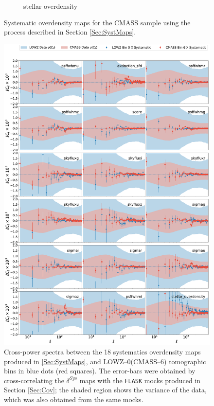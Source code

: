 \begin{figure}
\begin{subfigure}{.33\textwidth}
\label{fig:systmap18}
    \caption{stellar overdensity}
\end{subfigure}
\caption[Systematic overdensity maps]{Systematic overdensity maps for the CMASS sample using the process described in Section \ref{Sec:SystMaps}.}
\label{fig:SYS_Appendix1Map}
\end{figure}

\begin{figure}
\begin{center}
\includegraphics[width=\textwidth]{BOSS-FIGS/systematics_CMASS_Bin0_LOWZ_Bin0.pdf}
\caption[Cross-power spectra between systematics and LOWZ--0(CMASS--6) tomographic bins.]{Cross-power spectra between the 18 systematics overdensity maps produced in \ref{Sec:SystMaps}, and LOWZ--0(CMASS--6) tomographic bins in blue dots (red squares). The error-bars were obtained by cross-correlating the $\delta^{Sys}$ maps with the \texttt{FLASK} mocks produced in Section \ref{Sec:Cov}; the shaded region shows the variance of the data, which was also obtained from the same mocks.}
\label{fig:SystBin0}
\end{center}
\end{figure}

